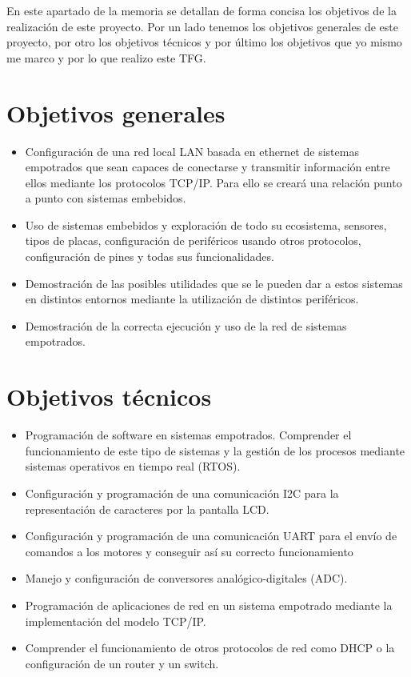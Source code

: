 
En este apartado de la memoria se detallan de forma concisa los objetivos de la realización de este proyecto. Por un lado tenemos los objetivos generales de este proyecto, por otro los objetivos técnicos y por último los objetivos que yo mismo me marco y por lo que realizo este TFG.

\section{Objetivos generales}\label{sec:OGenerales}
\begin{itemize}	
		\item Configuración de una red local LAN basada en ethernet de sistemas empotrados que sean capaces de conectarse y transmitir información entre ellos mediante los protocolos TCP/IP. Para ello se creará una relación punto a punto con sistemas embebidos.
		\item Uso de sistemas embebidos y exploración de todo su ecosistema, sensores, tipos de placas, configuración de periféricos usando otros protocolos, configuración de pines y todas sus funcionalidades.
		\item Demostración de las posibles utilidades que se le pueden dar a estos sistemas en distintos entornos mediante la utilización de distintos periféricos.
		\item Demostración de la correcta ejecución y uso de la red de sistemas empotrados.
\end{itemize}
	
\section{Objetivos técnicos}\label{sec:OTecnicos}
\begin{itemize}
	\item Programación de software en sistemas empotrados. Comprender el funcionamiento de este tipo de sistemas y la gestión de los procesos mediante sistemas operativos en tiempo real (RTOS).
	\item Configuración y programación de una comunicación I2C para la representación de caracteres por la pantalla LCD.
	\item Configuración y programación de una comunicación UART para el envío de comandos a los motores y conseguir así su correcto funcionamiento
	\item Manejo y configuración de conversores analógico-digitales (ADC).
	\item Programación de aplicaciones de red en un sistema empotrado mediante la implementación del modelo TCP/IP. 
	\item Comprender el funcionamiento de otros protocolos de red como DHCP o la configuración de un router y un switch.
\end{itemize}
			
